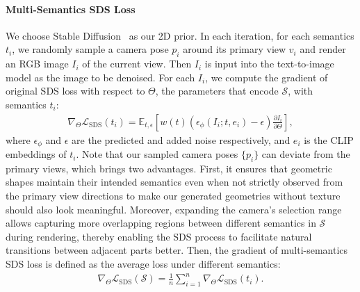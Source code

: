 \paragraph{Multi-Semantics SDS Loss}
We choose Stable Diffusion~\cite{LatentDiffusion} as our 2D prior. In each iteration, for each semantics $t_i$, we randomly sample a camera pose $p_i$  around its primary view $v_i$ and render an RGB image $I_i$ of the current view. Then $I_i$ is input into 
the text-to-image model as the image to be denoised. For each $I_i$, we compute the gradient of original SDS loss with respect to $\Theta$, the parameters that encode $\mathcal{S}$, with semantics $t_i$:
\begin{equation}
    \begin{aligned}
        \nabla_{\Theta} \mathcal{L}_{\mathrm{SDS}}(t_i)= \mathbb{E}_{t,  \epsilon}\left[w(t)\left(\epsilon_{\phi}\left(I_{i} ; t, e_i\right)-\epsilon\right) \frac{\partial I_{i}}{\partial \Theta}\right],
    \end{aligned}
    \label{eq:SDS}
\end{equation}
where $\epsilon_{\phi}$ and $\epsilon$ are the predicted and added noise respectively, and $e_i$ is the CLIP embeddings of $t_i$.
Note that our sampled camera poses $\{p_i\}$ can deviate from the primary views, which brings two advantages. First, it ensures that geometric shapes maintain their intended semantics even when not strictly observed from the primary view directions to make our generated geometries without texture should also look meaningful. Moreover, expanding the camera's selection range allows capturing more overlapping regions between different semantics in $\mathcal{S}$ during rendering, thereby enabling the SDS process to facilitate natural transitions between adjacent parts better. Then, the gradient of multi-semantics SDS loss is defined as the average loss under different semantics: 
\begin{equation}
    \begin{aligned}
        \nabla_{\Theta} \mathcal{L}_{\mathrm{SDS}}(\mathcal{S})= \frac{1}{n}\sum\nolimits^n_{i=1}\nabla_{\Theta} \mathcal{L}_{\mathrm{SDS}}(t_i).
    \end{aligned}
    \label{eq:multiSDS}
\end{equation}

